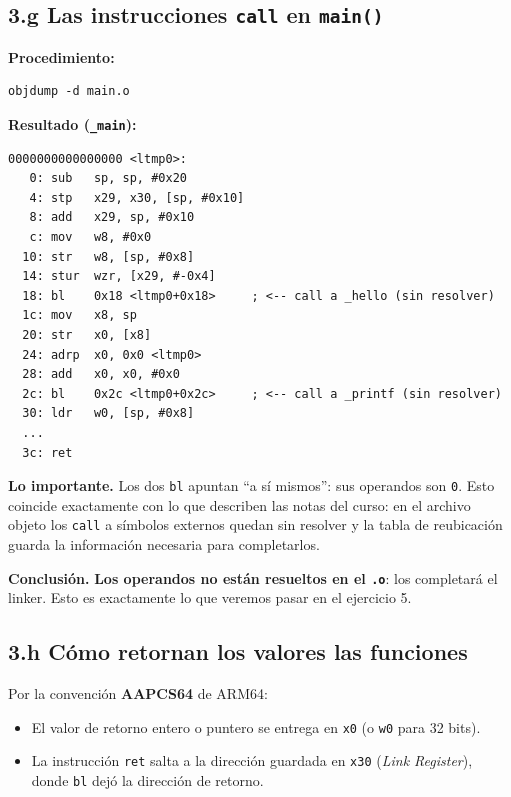 \documentclass[11pt,a4paper]{article}
\begin{document}
\subsection*{3.g Las instrucciones \texttt{call} en \texttt{main()}}

\textbf{Procedimiento:}

\begin{lstlisting}
objdump -d main.o
\end{lstlisting}

\textbf{Resultado (\texttt{\_main}):}

\begin{lstlisting}[style=asmstyle]
0000000000000000 <ltmp0>:
   0: sub   sp, sp, #0x20
   4: stp   x29, x30, [sp, #0x10]
   8: add   x29, sp, #0x10
   c: mov   w8, #0x0
  10: str   w8, [sp, #0x8]
  14: stur  wzr, [x29, #-0x4]
  18: bl    0x18 <ltmp0+0x18>     ; <-- call a _hello (sin resolver)
  1c: mov   x8, sp
  20: str   x0, [x8]
  24: adrp  x0, 0x0 <ltmp0>
  28: add   x0, x0, #0x0
  2c: bl    0x2c <ltmp0+0x2c>     ; <-- call a _printf (sin resolver)
  30: ldr   w0, [sp, #0x8]
  ...
  3c: ret
\end{lstlisting}

\textbf{Lo importante.} Los dos \texttt{bl} apuntan ``a sí mismos'':
sus operandos son \texttt{0}. Esto coincide exactamente con lo que
describen las notas del curso: en el archivo objeto los \texttt{call}
a símbolos externos quedan sin resolver y la tabla de reubicación
guarda la información necesaria para completarlos.

\textbf{Conclusión.} \textbf{Los operandos no están resueltos en el
\texttt{.o}}: los completará el linker. Esto es exactamente lo que
veremos pasar en el ejercicio 5.

\subsection*{3.h Cómo retornan los valores las funciones}

Por la convención \textbf{AAPCS64} de ARM64:

\begin{itemize}[leftmargin=*]
    \item El valor de retorno entero o puntero se entrega en
        \texttt{x0} (o \texttt{w0} para 32 bits).
    \item La instrucción \texttt{ret} salta a la dirección guardada en
        \texttt{x30} (\emph{Link Register}), donde \texttt{bl} dejó la
        dirección de retorno.
\end{itemize}
\end{document}
